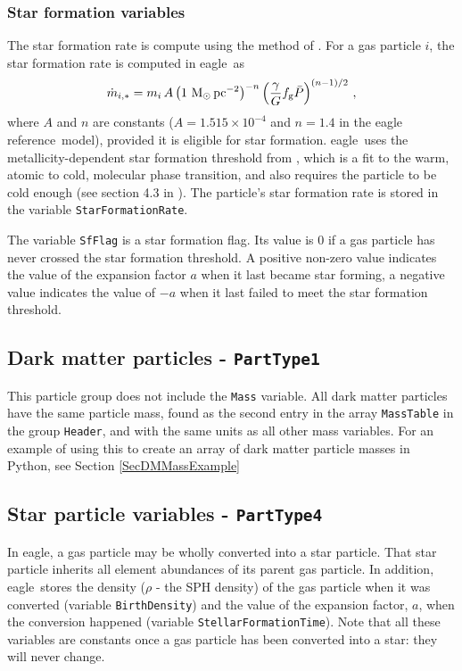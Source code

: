 \documentclass[10pt, a4paper]{article}
\newcommand{\eagle}{{\sc eagle}}
\newcommand{\REF}{{\sc eagle reference}}
\begin{document}
\subsubsection{Star formation variables}
\label{SecSFR}

The star formation rate is compute using the method of \cite{2008MNRAS.383.1210S}. For a gas particle $i$, the star formation rate is computed in \eagle\ as \begin{equation} \dot{m}_{i,\ast} = m_i\, A \left (1~{\rm M}_\odot\,{\rm pc}^{-2}\right)^{-n} \left ({\gamma \over G} f_{\rm g} \bar{P}\right)^{(n-1)/2}\,, \label{EqSFLaw} \end{equation} where $A$ and $n$ are constants ($A=1.515\times 10^{-4}$ and $n=1.4$ in the \REF\ model), provided it is eligible for star formation. \eagle\ uses the metallicity-dependent star formation threshold from \cite{2004ApJ...609..667S}, which is a fit to the warm, atomic to cold, molecular phase transition, and also requires the particle to be cold enough (see section 4.3 in \cite{2015MNRAS.446..521S}). The particle's star formation rate is stored in the variable \texttt{StarFormationRate}.

The variable \texttt{SfFlag} is a star formation flag. Its value is 0 if a gas particle has never crossed the star formation threshold. A positive non-zero value indicates the value of the expansion factor $a$ when it last became star forming, a negative value indicates the value of $-a$ when it last failed to meet the star formation threshold.

\subsection{Dark matter particles - \texttt{PartType1}}

This particle group does not include the \texttt{Mass} variable. All dark matter particles have the same particle mass, found as the second entry in the array \texttt{MassTable} in the group \texttt{Header}, and with the same units as all other mass variables. For an example of using this to create an array of dark matter particle masses in {\sc Python}, see Section \ref{SecDMMassExample}

\subsection{Star particle variables - \texttt{PartType4}}
\label{SecFeedback}

In \eagle, a gas particle may be wholly converted into a star particle. That star particle inherits all element abundances of its parent gas particle. In addition, \eagle\ stores the density ($\rho$ - the SPH density) of the gas particle when it was converted (variable \texttt{BirthDensity}) and the value of the expansion factor, $a$, when the conversion happened (variable \texttt{StellarFormationTime}). Note that all these variables are constants once a gas particle has been converted into a star: they will never change.
\end{document}

